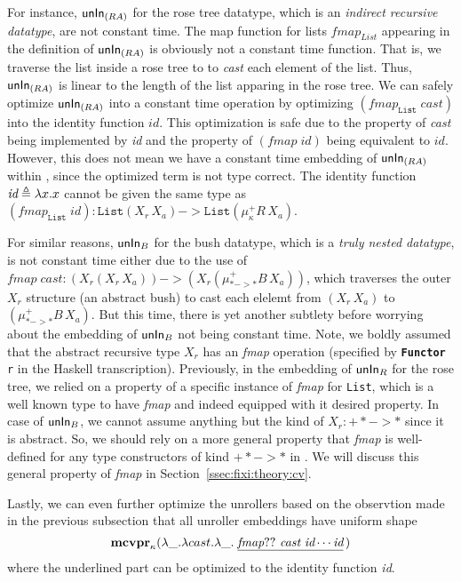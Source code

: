 For instance, $\mathsf{unIn}_{(R A)}$ for the rose tree datatype, which is an
\emph{indirect recursive datatype}, are not constant time. The map function
for lists $\textit{fmap}_\textit{List}$ appearing in the definition
of $\mathsf{unIn}_{(R A)}$ is obviously not a constant time function. That is,
we traverse the list inside a rose tree to to \textit{cast} each element of
the list. Thus, $\mathsf{unIn}_{(R A)}$ is linear to the length of the list apparing
in the rose tree. We can safely optimize $\mathsf{unIn}_{(R A)}$ into a constant time
operation by optimizing $(\textit{fmap}_\texttt{List}\;\textit{cast})$
into the identity function $\textit{id}$. This optimization is safe due to
the property of \textit{cast} being implemented by \textit{id}
and the property of $(\textit{fmap}\;\textit{id})$ being
equivalent to $\textit{id}$.
However, this does not mean we have a constant time embedding of $\mathsf{unIn}_{(R A)}$
within \Fixi, since the optimized term is not type correct.
The identity function $\textit{id}\triangleq \lambda x.x$ cannot be given
the same type as $(\textit{fmap}_\texttt{List}\;\textit{id}) :
	\texttt{List}(X_r\,X_a) -> \texttt{List}(\mu^{+}_\kappa R\,X_a)$.

For similar reasons, $\mathsf{unIn}_B$ for the bush datatype, which is a
\emph{truly nested datatype}, is not constant time either
due to the use of $\textit{fmap}\;\textit{cast} :
			(X_r(X_r\,X_a)) -> (X_r(\mu^{+}_{* -> *}B\,X_a))$,
which traverses the outer $X_r$ structure (an abstract bush) to cast each
elelemt from $(X_r\,X_a)$ to $(\mu^{+}_{* -> *}B\,X_a)$. But this time,
there is yet another subtlety before worrying about the embedding of
$\mathsf{unIn}_B$ not being constant time. Note, we boldly assumed that
the abstract recursive type $X_r$ has an \textit{fmap} operation
(specified by \texttt{{\bf\ttfamily Functor} r} in the Haskell transcription).
Previously, in the embedding of $\mathsf{unIn}_R$ for the rose tree, we relied on
a property of a specific instance of \textit{fmap} for \texttt{List},
which is a well known type to have \textit{fmap} and indeed equipped with
it desired property. In case of $\mathsf{unIn}_B$, we cannot assume anything but
the kind of $X_r : +* -> *$ since it is abstract. So, we should rely on
a more general property that \textit{fmap} is well-defined for any
type constructors of kind $+* -> *$ in \Fixi. We will discuss this
general property of \textit{fmap} in Section~\ref{ssec:fixi:theory:cv}.

Lastly, we can even further optimize the unrollers based on the observtion
made in the previous subsection that all unroller embeddings have uniform shape
\[
\mathbf{mcvpr}_\kappa (\lambda\_.\lambda cast.\lambda\_.\;
	\underline{\textit{fmap}??~\textit{cast}~\textit{id}\cdots\textit{id}}
	\,)
\]
where the underlined part can be optimized to the identity function \textit{id}.

